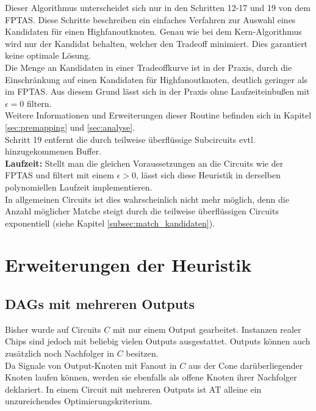 \documentclass[11pt, a4paper, german]{article}
\begin{document}
Dieser Algorithmus unterscheidet sich nur in den Schritten 12-17 und 19 von dem FPTAS. Diese Schritte beschreiben ein einfaches Verfahren zur Auswahl eines Kandidaten für einen Highfanoutknoten. Genau wie bei dem  Kern-Algorithmus wird nur der Kandidat behalten, welcher den Tradeoff minimiert. Dies garantiert keine optimale Lösung. \\
Die Menge an Kandidaten in einer Tradeoffkurve ist in der Praxis, durch die Einschränkung auf einen Kandidaten für Highfanoutknoten, deutlich geringer als im FPTAS. Aus diesem Grund lässt sich in der Praxis ohne Laufzeiteinbußen mit $\epsilon = 0$ filtern.\\ 
Weitere Informationen und Erweiterungen dieser Routine befinden sich in Kapitel \ref{sec:premapping} und \ref{sec:analyse}. \\
Schritt 19 entfernt die durch teilweise überflüssige Subcircuits evtl. hinzugekommenen Buffer.\\

{\bf Laufzeit: } Stellt man die gleichen Voraussetzungen an die Circuits wie der FPTAS und filtert mit einem $\epsilon  > 0$, lässt sich diese Heuristik in derselben polynomiellen Laufzeit implementieren.\\
In allgemeinen Circuits ist dies wahrscheinlich nicht mehr möglich, denn die Anzahl möglicher Matche steigt durch die teilweise überflüssigen Circuits exponentiell  (siehe Kapitel \ref{subsec:match_kandidaten}).


\section{Erweiterungen der Heuristik}
\label{sec:erw_der_heuristik}
\subsection{DAGs mit mehreren Outputs}
\label{sec:outputs}
Bisher wurde auf Circuits $C$ mit nur einem Output gearbeitet. Instanzen realer Chips sind jedoch mit beliebig vielen Outputs ausgestattet. Outputs können auch zusätzlich noch Nachfolger in $C$ besitzen. \\

 Da Signale von Output-Knoten mit Fanout in $C$ aus der Cone darüberliegender Knoten laufen können, werden sie ebenfalls als offene Knoten ihrer Nachfolger deklariert. In einem Circuit mit mehreren Outputs ist AT alleine ein unzureichendes Optimierungskriterium.
\end{document}
